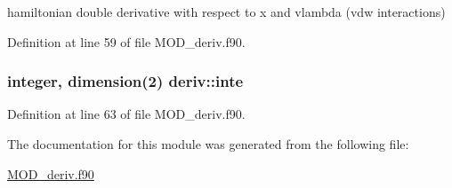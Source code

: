 hamiltonian double derivative with respect to x and vlambda (vdw interactions) 



Definition at line 59 of file M\-O\-D\-\_\-deriv.\-f90.

\hypertarget{classderiv_acf56b2c91f35dd1d9a7186aab5fe5059}{
\subsubsection[{inte}]{\setlength{\rightskip}{0pt plus 5cm}integer, dimension(2) deriv\-::inte}}\label{classderiv_acf56b2c91f35dd1d9a7186aab5fe5059}


Definition at line 63 of file M\-O\-D\-\_\-deriv.\-f90.



The documentation for this module was generated from the following file\-:\begin{DoxyCompactItemize}
\item 
\hyperlink{MOD__deriv_8f90}{M\-O\-D\-\_\-deriv.\-f90}\end{DoxyCompactItemize}
